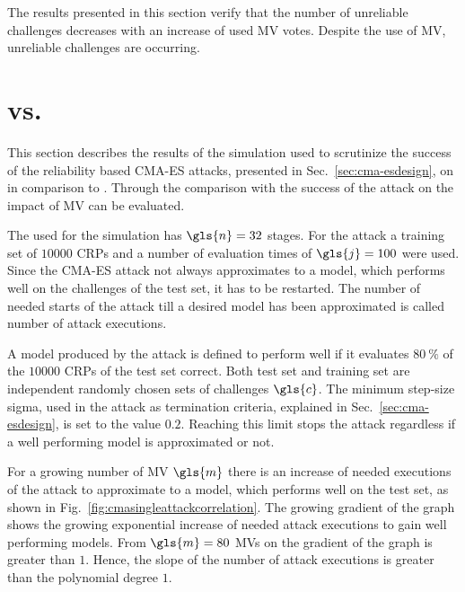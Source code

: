 The results presented in this section verify that the number of unreliable challenges decreases with an increase of used \ac{MV} votes.
Despite the use of \ac{MV}, unreliable challenges are occurring.


\section{\apufs vs. \mpufs}
\label{sec:arbitervsmajorityarbiter}

This section describes the results of the simulation used to scrutinize the success of the reliability based \ac{CMA-ES} attacks, presented in Sec.\ \ref{sec:cma-esdesign}, on \mpufs in comparison to \apufs.
Through the comparison with the success of the attack on \apuf the impact of \ac{MV} can be evaluated.

The \apuf used for the simulation has $\gls{n} = 32$ stages.
For the attack a training set of $10000$ \acp{CRP} and a number of evaluation times of $\gls{j} = 100$ were used.
Since the \ac{CMA-ES} attack not always approximates to a model, which performs well on the challenges of the test set, it has to be restarted.
The number of needed starts of the attack till a desired model has been approximated is called number of attack executions.

A model produced by the attack is defined to perform well if it evaluates $80\ \%$ of the $10000$ \acp{CRP} of the test set correct.
Both test set and training set are independent randomly chosen sets of challenges $\gls{c}$.
The minimum step-size sigma, used in the attack as termination criteria, explained in Sec.\ \ref{sec:cma-esdesign}, is set to the value $0.2$.
Reaching this limit stops the attack regardless if a well performing model is approximated or not.

For a growing number of \ac{MV} $\gls{m}$ there is an increase of needed executions of the attack to approximate to a model, which performs well on the test set, as shown in Fig.\ \ref{fig:cmasingleattackcorrelation}.
The growing gradient of the graph shows the growing exponential increase of needed attack executions to gain well performing models.
From $\gls{m} = 80$ \acp{MV} on the gradient of the graph is greater than $1$.
Hence, the slope of the number of attack executions is greater than the polynomial degree $1$.

